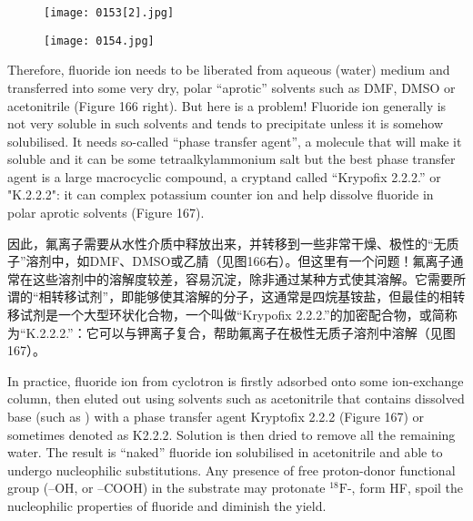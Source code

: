 \documentclass[dvipsnames, svgnames,a4paper,11pt]{article}
\begin{document}
\begin{figure}[h]
	\centering
    \texttt{[image: 0153[2].jpg]}    
     \label{fig166}
\end{figure}

\begin{figure}[h]
	\centering
    \texttt{[image: 0154.jpg]}    
     \label{fig167}
\end{figure}
Therefore, fluoride ion needs to be liberated from aqueous (water) medium and
transferred into some very dry, polar “aprotic” solvents such as DMF, DMSO or
acetonitrile (Figure 166 right). But here is a problem! Fluoride ion generally is not
very soluble in such solvents and tends to precipitate unless it is somehow
solubilised. It needs so-called “phase transfer agent”, a molecule that will make it
soluble and it can be some tetraalkylammonium salt but the best phase transfer
agent is a large macrocyclic compound, a cryptand called “Krypofix 2.2.2.”
or "K.2.2.2": it can complex potassium counter ion and help dissolve fluoride in polar
aprotic solvents (Figure 167).

因此，氟离子需要从水性介质中释放出来，并转移到一些非常干燥、极性的“无质子”溶剂中，如DMF、DMSO或乙腈（见图166右）。但这里有一个问题！氟离子通常在这些溶剂中的溶解度较差，容易沉淀，除非通过某种方式使其溶解。它需要所谓的“相转移试剂”，即能够使其溶解的分子，这通常是四烷基铵盐，但最佳的相转移试剂是一个大型环状化合物，一个叫做“Krypofix 2.2.2.”的加密配合物，或简称为“K.2.2.2.”：它可以与钾离子复合，帮助氟离子在极性无质子溶剂中溶解（见图167）。

In practice, fluoride ion from cyclotron is firstly adsorbed onto some ion-exchange
column, then eluted out using solvents such as acetonitrile that contains dissolved
base (such as ) with a phase transfer agent Kryptofix 2.2.2 (Figure 167) or
sometimes denoted as K2.2.2. Solution is then dried to remove all the remaining
water. The result is “naked” fluoride ion solubilised in acetonitrile and able to undergo
nucleophilic substitutions. Any presence of free proton-donor functional group (–OH,
 or –COOH) in the substrate may protonate ${}^\mathrm{18}\mathrm{F}$-, form HF, spoil the nucleophilic
properties of fluoride and diminish the yield.
\end{document}
